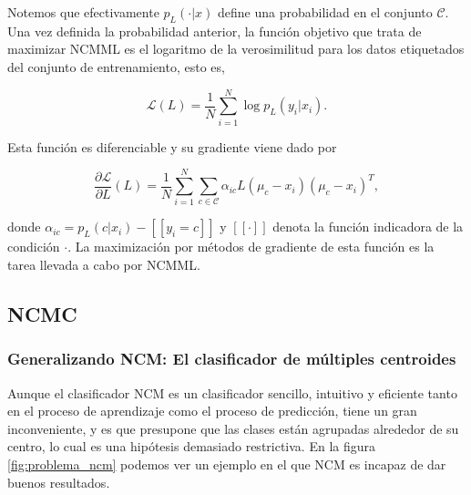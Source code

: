 Notemos que efectivamente $p_L(\cdot|x)$ define una probabilidad en el conjunto $\mathcal{C}$. Una vez definida la probabilidad anterior, la función objetivo que trata de maximizar NCMML es el logaritmo de la verosimilitud para los datos etiquetados del conjunto de entrenamiento, esto es,

\begin{equation}
\mathcal{L}(L) = \frac{1}{N}\sum_{i=1}^N\log p_L(y_i|x_i).
\end{equation} 

Esta función es diferenciable y su gradiente viene dado por

\begin{equation}
\frac{\partial \mathcal{L}}{\partial L}(L) = \frac{1}{N} \sum_{i=1}^N \sum\limits_{c\in \mathcal{C}} \alpha_{ic} L (\mu_c - x_i)(\mu_c - x_i)^T,
\end{equation}

donde $\alpha_{ic} = p_L(c|x_i) - [\![ y_i = c ]\!]$ y $[\![ \cdot ]\!]$ denota la función indicadora de la condición $\cdot$. La maximización por métodos de gradiente de esta función es la tarea llevada a cabo por NCMML.



\subsection{NCMC} \label{section:ncmc}

\subsubsection{Generalizando NCM: El clasificador de múltiples centroides}

Aunque el clasificador NCM es un clasificador sencillo, intuitivo y eficiente tanto en el proceso de aprendizaje como el proceso de predicción, tiene un gran inconveniente, y es que presupone que las clases están agrupadas alrededor de su centro, lo cual es una hipótesis demasiado restrictiva. En la figura \ref{fig:problema_ncm} podemos ver un ejemplo en el que NCM es incapaz de dar buenos resultados.

